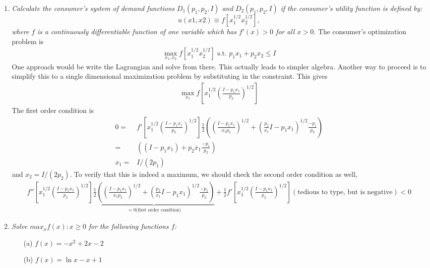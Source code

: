 \documentclass[10pt]{article}
\begin{document}
\begin{enumerate}
\item \textit{Calculate the consumer's system of demand functions
    $D_1(p_1, p_2, I)$ and $D_2 (p_1, p_2, I)$ if the consumer's
    utility function is defined by:}
    \[  u(x1, x2) ≡ f[x_1^{1/2} x_2^{1/2} ], \]  
    \textit{where $f$ is a continuously differentiable function of one
    variable which has $f'(x) > 0$ for all $x > 0$.}
  The consumer's optimization problem is 
  \begin{align*}
    \max_{x_1,x_2} f[x_1^{1/2} x_2^{1/2} ] \text{ s.t. } p_1 x_1 + p_2
    x_2 \leq I
  \end{align*}
  One approach would be write the Lagrangian and solve from
  there. This actually leads to simpler algebra. Another way to
  proceed is to simplify this to a single dimensional maximization
  problem by substituting in the constraint. This gives
  \begin{align*}
    \max_{x_1} f\left[x_1^{1/2} \left(\frac{I - p_1 x_1}{p_2}\right)^{1/2}\right]
  \end{align*}
  The first order condition is
  \begin{align*}
    0 = & f'\left[x_1^{1/2} \left(\frac{I - p_1 x_1}{p_2}\right)^{1/2}\right] 
    \frac{1}{2}\left(\left(\frac{I - p_1 x_1}{x_1 p_2}\right)^{1/2} +
    \left(\frac{p_2}{x_1}{I - p_1 x_1}\right)^{1/2} \frac{-p_1}{p_2}\right) \\
    = & \left( (I-p_1 x_1) + p_2 x_1 \frac{-p_1}{p_2}\right) \\
    x_1 = & I/(2 p_1) 
  \end{align*}
  and $x_2 = I/(2 p_2)$. To verify that this is indeed a maximum, we
  should check the second order condition as well,
  \begin{align*}
    f''\left[x_1^{1/2} \left(\frac{I - p_1 x_1}{p_2}\right)^{1/2}\right]
    \underbrace{\frac{1}{2}\left(\left(\frac{I - p_1 x_1}{x_1
            p_2}\right)^{1/2} + 
    \left(\frac{p_2}{x_1}{I - p_1 x_1}\right)^{1/2}
    \frac{-p_1}{p_2}\right)}_{ = 0 
  \text{(first order condtion)}}
+ \frac{1}{2} f'\left[x_1^{1/2} \left(\frac{I - p_1
      x_1}{p_2}\right)^{1/2}\right] 
\left(\text{tedious to type, but is negative} \right) < 0
  \end{align*}
\item \textit{Solve $max_x {f(x):  x ≥ 0}$ for the following functions
    $f$:}
    \begin{itemize}
    \item[(a)] $f(x) = -x^2 + 2x - 2$
    \item[(b)] $f(x) = \ln x - x + 1$

\end{itemize}
\end{enumerate}
\end{document}
